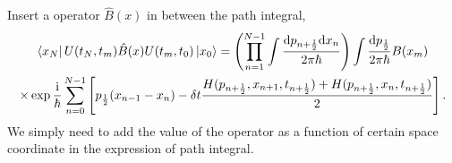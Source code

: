 

Insert a operator $\hat{B}(x)$ in between the path integral, 
\begin{equation}
    \begin{gathered}
        \bra{x_N} U(t_N, t_m) \hat{B}(x) U(t_m, t_0) \ket{x_0} = 
        \left( \prod_{n=1}^{N-1} \int \frac{\mathrm{d} p_{n+\frac{1}{2}}\mathrm{d} x_n}{2\pi \hbar} \right) \int \frac{\mathrm{d} p_{\frac{1}{2}}}{2\pi\hbar} 
        B(x_m)
        \\
        \times \exp \frac{\mathrm{i} }{\hbar} \sum_{n=0}^{N-1} \left[ p_{\frac{1}{2}}(x_{n-1}- x_{n})  - \delta t \frac{H(p_{n+\frac{1}{2}}, x_{n+1}, t_{n+\frac{1}{2}}) + H(p_{n+\frac{1}{2}}, x_{n}, t_{n+ \frac{1}{2}})}{2}\right] .
    \end{gathered}
\end{equation}
We simply need to add the value of the operator as a function of certain space coordinate in the expression of path integral.

